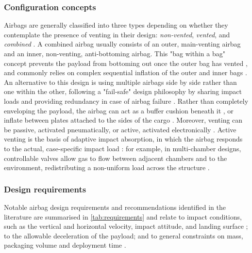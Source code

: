 \subsubsection{Configuration concepts}
Airbags are generally classified into three types depending on whether they contemplate the presence of venting in their design: \textit{non-vented}, \textit{vented}, and \textit{combined} \cite{Zhou2019}. A combined airbag usually consists of an outer, main-venting airbag and an inner, non-venting, anti-bottoming airbag. This "bag within a bag" concept prevents the payload from bottoming out once the outer bag has vented \cite{DoDeWeck2012,Tutt2008,GardinierTaylor1999}, and commonly relies on complex sequential inflation of the outer and inner bags \cite{GardinierTaylor1999}. An alternative to this design is using multiple airbags side by side rather than one within the other, following a "fail-safe" design philosophy by sharing impact loads and providing redundancy in case of airbag failure \cite{Smith2007}. Rather than completely enveloping the payload, the airbag can act as a buffer cushion beneath it \cite{GardinierTaylor1999}, or inflate between plates attached to the sides of the cargo \cite{Taylor2001}. Moreover, venting can be passive, activated pneumatically, or active, activated electronically \cite{WarrickLee2001,HolnickiSzulc2009}. Active venting is the basis of adaptive impact absorption, in which the airbag responds to the actual, case-specific impact load \cite{HolnickiSzulc2023}: for example, in multi-chamber designs, controllable valves allow gas to flow between adjacent chambers and to the environment, redistributing a non-uniform load across the structure \cite{HolnickiSzulc2009,HolnickiSzulc2015}.

\subsubsection{Design requirements}
Notable airbag design requirements and recommendations identified in the literature are summarised in \cref{tab:requirements} and relate to impact conditions, such as the vertical and horizontal velocity, impact attitude, and landing surface \cite{McCullough1964,Smith2007,DoDeWeck2012}; to the allowable deceleration of the payload; and to general constraints on mass, packaging volume and deployment time \cite{HolnickiSzulc2023,GardinierTaylor1999,Cadogan2002}.

